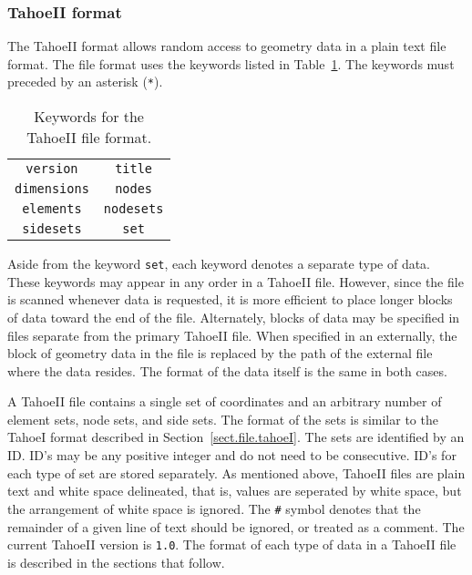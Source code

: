 \subsubsection{TahoeII format}
\label{sect.file.tahoeII}
The TahoeII format allows random access to geometry data in a plain 
text file format. The file format uses the keywords listed
in Table~\ref{tab.TahoeII.keywords}. The keywords must preceded by an
asterisk (\texttt{*}).
\begin{table}[h]
\caption{\label{tab.TahoeII.keywords} Keywords for the TahoeII file format.}
\begin{center}
\begin{tabular}[c]{cc}
\parbox[b]{2.0in}{\centering \texttt{version}} &
\parbox[b]{2.0in}{\centering \texttt{title}}\\
\parbox[b]{2.0in}{\centering \texttt{dimensions}} & 
\parbox[b]{2.0in}{\centering \texttt{nodes}}\\
\parbox[b]{2.0in}{\centering \texttt{elements}}  & 
\parbox[b]{2.0in}{\centering \texttt{nodesets}}\\
\parbox[b]{2.0in}{\centering \texttt{sidesets}}  & 
\parbox[b]{2.0in}{\centering \texttt{set}}\\
\end{tabular}
\end{center}
\end{table}
Aside from the keyword \texttt{set}, each keyword denotes a separate 
type of data. These keywords may appear in any order in a TahoeII file.
However, since the file is scanned whenever data is requested, it is 
more efficient to place longer blocks of data toward the end of the 
file. Alternately, blocks of data may be specified in files separate 
from the primary TahoeII file.
When specified in an externally, the block 
of geometry data in the file is replaced by the path of 
the external file where the data resides. The format of the data 
itself is the same in both cases.

A TahoeII file contains a single set of coordinates and an arbitrary 
number of element sets, node sets, and side sets. 
The format of the sets is similar to the TahoeI format described in 
Section~\ref{sect.file.tahoeI}.
The sets are 
identified by an ID. ID's may be any positive integer and do not need 
to be consecutive. ID's for each type of set are stored separately.
As mentioned above, TahoeII files are plain text and
white space delineated, that is, 
values are seperated by white space, but the arrangement of white space
is ignored.
The \texttt{\#} symbol denotes that the remainder of a given line of text 
should be ignored, or treated as a comment.
The current TahoeII version is \texttt{1.0}. The format of each type of
data in a TahoeII file is described in the sections that follow.

